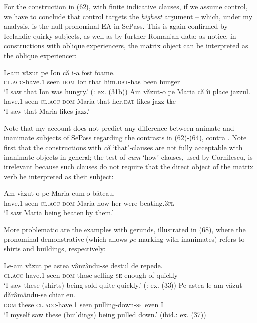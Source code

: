 \documentclass[output=paper]{langsci/langscibook}
\begin{document}
For the construction in (62), with finite indicative clauses, if we assume control, we have to conclude that control targets the \textit{highest} argument – which, under my analysis, is the null pronominal EA in SePass. This is again confirmed by Icelandic quirky subjects, as well as by further Romanian data: as \citet{Alboiu2016} notice, in constructions with oblique experiencers, the matrix object can be interpreted as the oblique experiencer: 

\ea%
    \label{ex:giurgea:66}
    \ea
    \gll L-am                văzut  pe Ion    că    i-a                 fost foame.   \\
         \textsc{cl.acc-}have.\textsc{1} seen   \textsc{dom} Ion that him.\textsc{dat-}has been hunger\\
    \glt ‘I saw that Ion was hungry.’ (\citealt{Alboiu2016}: ex. (31b))
    \ex
    \gll Am    văzut-o          pe     Maria că    îi           place jazzul.\\
          have.\textsc{1} seen{}-\textsc{cl.acc} \textsc{dom}  Maria that her.\textsc{dat} likes  jazz-the \\
    \glt ‘I saw that Maria likes jazz.’
    \z
\z    

Note that my account does not predict any difference between animate and inanimate subjects of SePass regarding the contrasts in (62)-(64), contra \citet{Cornilescu1998}. Note first that the constructions with \textit{că} ‘that’\textit{{}-}clauses are not fully acceptable with inanimate objects in general; the test of \textit{cum} ‘how’-clauses, used by Cornilescu, is irrelevant because such clauses do not require that the direct object of the matrix verb be interpreted as their subject:

\ea%
    \label{ex:giurgea:67}
    \gll Am      văzut-o         pe     Maria cum o    băteau.\\
         have.\textsc{1} seen-\textsc{cl.acc dom} Maria how  her were-beating.\textsc{3pl}\\
    \glt ‘I saw Maria being beaten by them.’  
    \z


More problematic are the examples with gerunds, illustrated in (68), where the pronominal demonstrative (which allows \textit{pe-}marking with inanimates) refers to shirts and buildings, respectively: 

\ea%
    \label{ex:giurgea:68}
    \ea
    \gll Le-am              văzut pe    astea vânzându-se destul   de  repede.\\
         \textsc{cl.acc}{}-have.\textsc{1} seen  \textsc{dom} these selling-\textsc{se}      enough of  quickly      \\
    \glt ‘I saw these (shirts) being sold quite quickly.’ (\citealt{Cornilescu1998}: ex. (33))
    \ex
    \gll  Pe   astea  le-am               văzut dărâmându-se      chiar eu. \\
          \textsc{dom} these \textsc{cl.acc-}have.\textsc{1} seen  pulling-down-\textsc{se} even I     \\
    \glt ‘I myself saw these (buildings) being pulled down.’ (ibid.: ex. (37))
    \z
\z    
\end{document}
